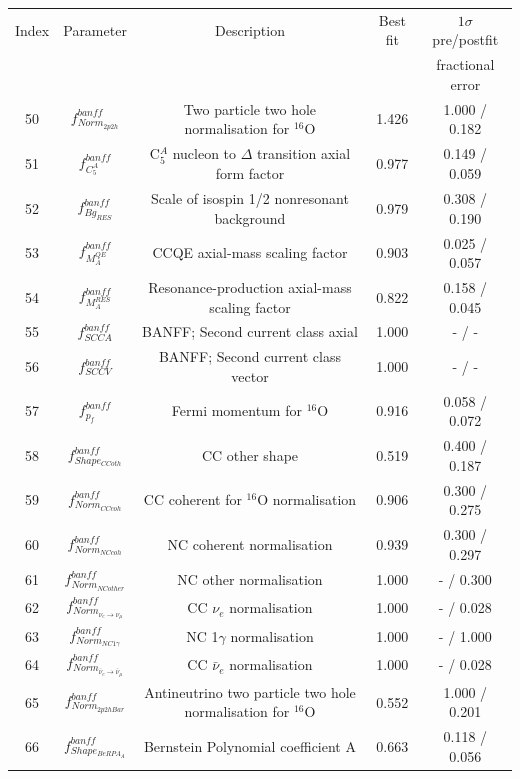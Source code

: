\begin{tabular} { | c | c | c | c | c |  }
\hline 
Index & Parameter & Description & Best fit & $1\sigma$ pre/postfit\\ 
 & &  &  & fractional error\\
\hline 
50 & $f_{Norm_{2p2h}}^{banff}$ & Two particle two hole normalisation for $^{16}$O & 1.426 & 1.000 / 0.182\\ 
51 & $f_{C^{A}_{5}}^{banff}$ & C$^{A}_{5}$ nucleon to $\Delta$ transition axial form factor & 0.977 & 0.149 / 0.059\\ 
52 & $f_{Bg_{RES}}^{banff}$ & Scale of isospin 1/2 nonresonant background & 0.979 & 0.308 / 0.190\\ 
53 & $f_{M_A^{QE}}^{banff}$ & CCQE axial-mass scaling factor & 0.903 & 0.025 / 0.057\\ 
54 & $f_{M_A^{RES}}^{banff}$ & Resonance-production axial-mass scaling factor & 0.822 & 0.158 / 0.045\\ 
55 & $f_{SCCA}^{banff}$ & BANFF; Second current class axial & 1.000 & - / -\\ 
56 & $f_{SCCV}^{banff}$ & BANFF; Second current class vector & 1.000 & - / -\\ 
57 & $f_{p_{f}}^{banff}$ & Fermi momentum for $^{16}$O & 0.916 & 0.058 / 0.072\\ 
58 & $f_{Shape_{CCoth}}^{banff}$ & CC other shape & 0.519 & 0.400 / 0.187\\ 
59 & $f_{Norm_{CCcoh}}^{banff}$ & CC coherent for $^{16}$O normalisation & 0.906 & 0.300 / 0.275\\ 
60 & $f_{Norm_{NCcoh}}^{banff}$ & NC coherent normalisation & 0.939 & 0.300 / 0.297\\ 
61 & $f_{Norm_{NCother}}^{banff}$ & NC other normalisation & 1.000 & - / 0.300\\ 
62 & $f_{Norm_{\nu_e \rightarrow \nu_\mu}}^{banff}$ & CC $\nu_{e}$ normalisation & 1.000 & - / 0.028\\ 
63 & $f_{Norm_{NC1\gamma}}^{banff}$ & NC 1$\gamma$ normalisation & 1.000 & - / 1.000\\ 
64 & $f_{Norm_{\bar{\nu}_e \rightarrow \bar{\nu}_{\mu}}}^{banff}$ & CC $\bar{\nu}_{e}$ normalisation & 1.000 & - / 0.028\\ 
65 & $f_{Norm_{2p2hBar}}^{banff}$ & Antineutrino two particle two hole normalisation for $^{16}$O & 0.552 & 1.000 / 0.201\\ 
66 & $f_{Shape_{BeRPA_{A}}}^{banff}$ & Bernstein Polynomial coefficient A & 0.663 & 0.118 / 0.056\\ 

\end{tabular}
